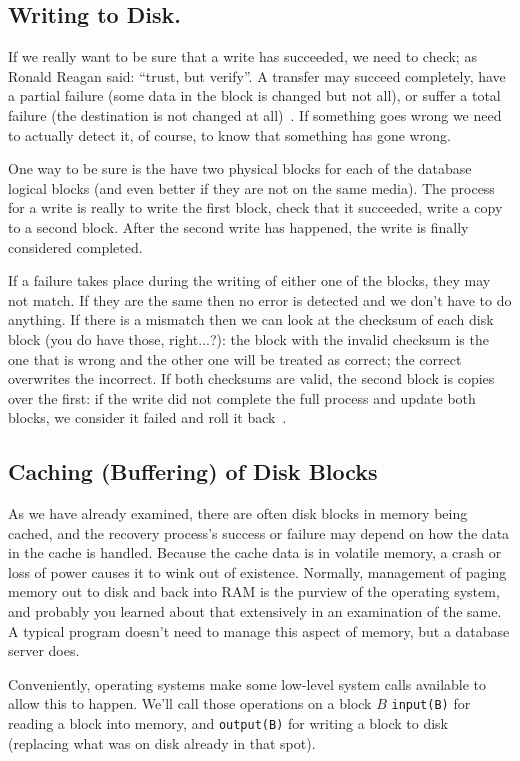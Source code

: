 \subsection*{Writing to Disk.}

If we really want to be sure that a write has succeeded, we need to check; as Ronald Reagan said: ``trust, but verify''. A transfer may succeed completely, have a partial failure (some data in the block is changed but not all), or suffer a total failure (the destination is not changed at all)~\cite{dsc}. If something goes wrong we need to actually detect it, of course, to know that something has gone wrong. 

One way to be sure is the have two physical blocks for each of the database logical blocks (and even better if they are not on the same media). The process for a write is really to write the first block, check that it succeeded, write a copy to a second block. After the second write has happened, the write is finally considered completed. 

If a failure takes place during the writing of either one of the blocks, they may not match. If they are the same then no error is detected and we don't have to do anything. If there is a mismatch then we can look at the checksum of each disk block (you do have those, right...?): the block with the invalid checksum is the one that is wrong and the other one will be treated as correct; the correct overwrites the incorrect. If both checksums are valid, the second block is copies over the first: if the write did not complete the full process and update both blocks, we consider it failed and roll it back~\cite{dsc}.

\subsection*{Caching (Buffering) of Disk Blocks}

As we have already examined, there are often disk blocks in memory being cached, and the recovery process's success or failure may depend on how the data in the cache is handled. Because the cache data is in volatile memory, a crash or loss of power causes it to wink out of existence. Normally, management of paging memory out to disk and back into RAM is the purview of the operating system, and probably you learned about that extensively in an examination of the same. A typical program doesn't need to manage this aspect of memory, but a database server does.

Conveniently, operating systems make some low-level system calls available to allow this to happen. We'll call those operations on a block $B$ \texttt{input(B)} for reading a block into memory, and \texttt{output(B)} for writing a block to disk (replacing what was on disk already in that spot). 

